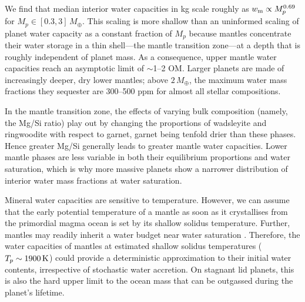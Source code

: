 \documentclass[fleqn,usenatbib]{mnras}
\begin{document}
We find that median interior water capacities in kg scale roughly as $w_{\rm m} \propto M_p^{0.69}$ for $M_p \in [0.3, 3]\,M_\oplus$. This scaling is more shallow than an uninformed scaling of planet water capacity as a constant fraction of $M_p$ because mantles concentrate their water storage in a thin shell---the mantle transition zone---at a depth that is roughly independent of planet mass. As a consequence, upper mantle water capacities reach an asymptotic limit of $\sim$1--2 OM. Larger planets are made of increasingly deeper, dry lower mantles; above $2\,M_\oplus$, the maximum water mass fractions they sequester are 300--500 ppm for almost all stellar compositions.

In the mantle transition zone, the effects of varying bulk composition (namely, the Mg/Si ratio) play out by changing the proportions of wadsleyite and ringwoodite with respect to garnet, garnet being tenfold drier than these phases. Hence greater Mg/Si generally leads to greater mantle water capacities. Lower mantle phases are less variable in both their equilibrium proportions and water saturation, which is why more massive planets show a narrower distribution of interior water mass fractions at water saturation. 


Mineral water capacities are sensitive to temperature. However, we can assume that the early potential temperature of a mantle as soon as it crystallises from the primordial magma ocean is set by its shallow solidus temperature. Further, mantles may readily inherit a water budget near water saturation \citep{tikoo_fate_2017, dorn_hidden_2021, bower_retention_2021, miyazaki_wet_2022}. Therefore, the water capacities of mantles at estimated shallow solidus temperatures ($T_p \sim 1900\,{\rm K}$) could provide a deterministic approximation to their initial water contents, irrespective of stochastic water accretion. On stagnant lid planets, this is also the hard upper limit to the ocean mass that can be outgassed during the planet's lifetime.
\end{document}
